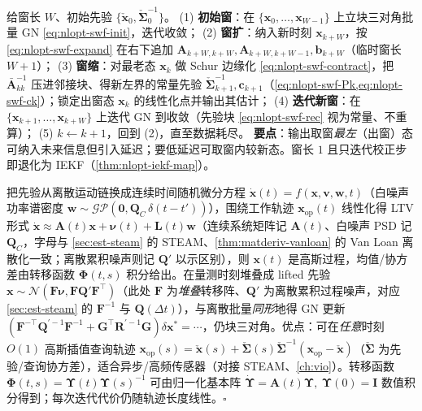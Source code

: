 \begin{algo}\label{alg:nlopt-swf}
给窗长 $W$、初始先验 $\{\check{\mathbf{x}}_0,\check{\boldsymbol{\Sigma}}_0^{-1}\}$。
(1) \textbf{初始窗}：在 $\{\mathbf{x}_0,\dots,\mathbf{x}_{W-1}\}$ 上立块三对角批量 GN \cref{eq:nlopt-swf-init}，迭代收敛；
(2) \textbf{窗扩}：纳入新时刻 $\mathbf{x}_{k+W}$，按 \cref{eq:nlopt-swf-expand} 在右下追加 $\mathbf{A}_{k+W,k+W},\mathbf{A}_{k+W,k+W-1},\mathbf{b}_{k+W}$（临时窗长 $W{+}1$）；
(3) \textbf{窗缩}：对最老态 $\mathbf{x}_k$ 做 Schur 边缘化 \cref{eq:nlopt-swf-contract}，把 $\bar{\mathbf{A}}_{kk}^{-1}$ 压进邻接块、得新左界的常量先验 $\check{\boldsymbol{\Sigma}}_{k+1}^{-1},\mathbf{c}_{k+1}$（\cref{eq:nlopt-swf-Pk,eq:nlopt-swf-ck}）；锁定出窗态 $\mathbf{x}_k$ 的线性化点并输出其估计；
(4) \textbf{迭代新窗}：在 $\{\mathbf{x}_{k+1},\dots,\mathbf{x}_{k+W}\}$ 上迭代 GN 到收敛（先验块 \cref{eq:nlopt-swf-rec} 视为常量、不重算）；
(5) $k\leftarrow k+1$，回到 (2)，直至数据耗尽。
\textbf{要点}：输出取窗\emph{最左}（出窗）态可纳入未来信息但引入延迟；要低延迟可取窗内较新态。窗长 $1$ 且只迭代校正步即退化为 IEKF（\cref{thm:nlopt-iekf-map}）。
\end{algo}

\begin{derivation}
把先验从离散运动链换成连续时间随机微分方程 $\dot{\mathbf{x}}(t)=f(\mathbf{x},\mathbf{v},\mathbf{w},t)$（白噪声功率谱密度 $\mathbf{w}\sim\mathcal{GP}(\mathbf{0},\mathbf{Q}_C\,\delta(t-t'))$），围绕工作轨迹 $\mathbf{x}_{\mathrm{op}}(t)$ 线性化得 LTV 形式 $\dot{\mathbf{x}}\approx\mathbf{A}(t)\mathbf{x}+\boldsymbol{\nu}(t)+\mathbf{L}(t)\mathbf{w}$（连续系统矩阵记 $\mathbf{A}(t)$、白噪声 PSD 记 $\mathbf{Q}_C$，字母与 \cref{sec:est-steam} 的 STEAM、\cref{thm:matderiv-vanloan} 的 Van Loan 离散化一致；离散累积噪声则记 $\mathbf{Q}'$ 以示区别），则 $\mathbf{x}(t)$ 是高斯过程，均值/协方差由转移函数 $\boldsymbol{\Phi}(t,s)$ 积分给出。在量测时刻堆叠成 lifted 先验 $\mathbf{x}\sim\mathcal{N}(\mathbf{F}\boldsymbol{\nu},\mathbf{F}\mathbf{Q}'\mathbf{F}^\top)$（此处 $\mathbf{F}$ 为\emph{堆叠}转移阵、$\mathbf{Q}'$ 为离散累积过程噪声，对应 \cref{sec:est-steam} 的 $\mathbf{F}^{-1}$ 与 $\mathbf{Q}(\Delta t)$），与离散批量\emph{同形}地得 GN 更新 $(\mathbf{F}^{-\top}\mathbf{Q}^{\prime-1}\mathbf{F}^{-1}+\mathbf{G}^\top\mathbf{R}^{\prime-1}\mathbf{G})\delta\mathbf{x}^*=\cdots$，仍块三对角。优点：可在\emph{任意}时刻 $O(1)$ 高斯插值查询轨迹 $\mathbf{x}_{\mathrm{op}}(s)=\check{\mathbf{x}}(s)+\check{\boldsymbol{\Sigma}}(s)\check{\boldsymbol{\Sigma}}^{-1}(\mathbf{x}_{\mathrm{op}}-\check{\mathbf{x}})$（$\check{\boldsymbol{\Sigma}}$ 为先验/查询协方差），适合异步/高频传感器（对接 STEAM、\cref{ch:vio}）。转移函数 $\boldsymbol{\Phi}(t,s)=\boldsymbol{\Upsilon}(t)\boldsymbol{\Upsilon}(s)^{-1}$ 可由归一化基本阵 $\dot{\boldsymbol{\Upsilon}}=\mathbf{A}(t)\boldsymbol{\Upsilon},\ \boldsymbol{\Upsilon}(0)=\mathbf{I}$ 数值积分得到；每次迭代代价仍随轨迹长度线性\cite{barfoot2024state}。\hfill$\square$
\end{derivation}
